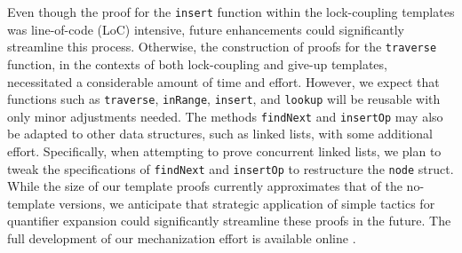 \documentclass[a4paper,UKenglish,cleveref, autoref, thm-restate]{lipics-v2021}
\newcommand{\wm}[1]{\textbf{\textcolor{violet}{[William: #1]}}}
\begin{document}

Even though the proof for the \texttt{insert} function within the lock-coupling templates was line-of-code (LoC) intensive, future enhancements could significantly streamline this process. Otherwise, the construction of proofs for the \texttt{traverse} function, in the contexts of both lock-coupling and give-up templates, necessitated a considerable amount of time and effort.
However, we expect that functions such as \texttt{traverse}, \texttt{inRange}, \texttt{insert}, and \texttt{lookup} will be reusable with only minor adjustments needed.  The methods \texttt{findNext} and \texttt{insertOp} may also be adapted to other data structures, such as linked lists, with some additional effort. 
Specifically, when attempting to prove concurrent linked lists, we plan to tweak the specifications of \texttt{findNext} and \texttt{insertOp} to restructure the \texttt{node} struct. While the size of our template proofs currently approximates that of the no-template versions, we anticipate that strategic application of simple tactics for quantifier expansion could significantly streamline these proofs in the future. The full development of our mechanization effort is available online
\href{https://github.com/PrincetonUniversity/DeepSpecDB/tree/master/concurrency/templates}{\color{blue}{https://github.com/PrincetonUniversity/DeepSpecDB/tree/master/concurrency/templates}}.
\end{document}

